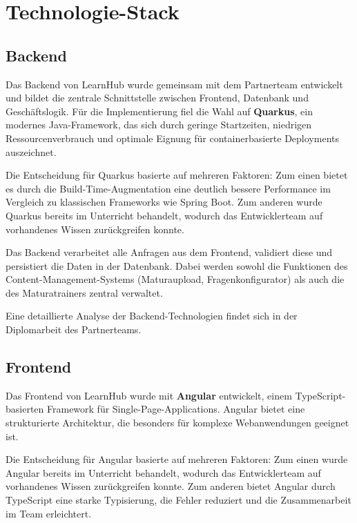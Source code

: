\section{Technologie-Stack}
\subsection{Backend}
Das Backend von LearnHub wurde gemeinsam mit dem Partnerteam entwickelt und bildet die zentrale Schnittstelle zwischen Frontend, 
Datenbank und Geschäftslogik. Für die Implementierung fiel die Wahl auf \textbf{Quarkus}, ein modernes Java-Framework, das sich durch geringe Startzeiten, 
niedrigen Ressourcenverbrauch und optimale Eignung für containerbasierte Deployments auszeichnet. \cite{quarkus}\par

Die Entscheidung für Quarkus basierte auf mehreren Faktoren: Zum einen bietet es durch die Build-Time-Augmentation 
eine deutlich bessere Performance im Vergleich zu klassischen Frameworks wie Spring Boot. \cite{quarkus-augmentation} 
Zum anderen wurde Quarkus bereits im Unterricht behandelt, wodurch das Entwicklerteam auf vorhandenes Wissen zurückgreifen konnte.\par

Das Backend verarbeitet alle Anfragen aus dem Frontend, validiert diese und persistiert die Daten in der Datenbank. Dabei werden sowohl die Funktionen 
des Content-Management-Systems (Maturaupload, Fragenkonfigurator) als auch die des Maturatrainers zentral verwaltet.\par

Eine detaillierte Analyse der Backend-Technologien findet sich in der Diplomarbeit des Partnerteams.
\subsection{Frontend}
Das Frontend von LearnHub wurde mit \textbf{Angular} entwickelt, einem Type\-Script-ba\-sier\-ten Framework 
für Single-Page-Applications. Angular bietet eine strukturierte Architektur, die besonders für komplexe 
Webanwendungen geeignet ist. \cite{angular}

Die Entscheidung für Angular basierte auf mehreren Faktoren: Zum einen wurde Angular bereits im Unterricht behandelt, 
wodurch das Entwicklerteam auf vorhandenes Wissen zurückgreifen konnte. Zum anderen bietet Angular durch TypeScript 
eine starke Typisierung, die Fehler reduziert und die Zusammenarbeit im Team erleichtert.


